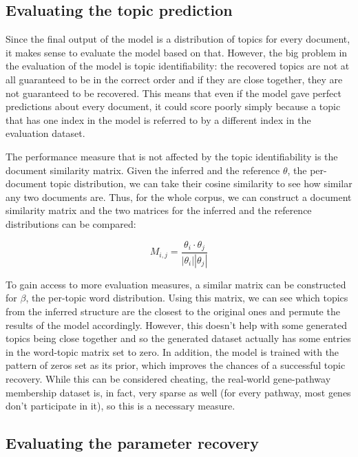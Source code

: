 \documentclass[12pt,a4paper,twoside,openright]{report}
\begin{document}
\subsection{Evaluating the topic prediction}

Since the final output of the model is a distribution of topics for every document, it makes sense to evaluate the model based on that. However, the big problem in the evaluation of the model is topic identifiability: the recovered topics are not at all guaranteed to be in the correct order and if they are close together, they are not guaranteed to be recovered. This means that even if the model gave perfect predictions about every document, it could score poorly simply because a topic that has one index in the model is referred to by a different index in the evaluation dataset.

The performance measure that is not affected by the topic identifiability is the document similarity matrix. Given the inferred and the reference $\theta$, the per-document topic distribution, we can take their cosine similarity to see how similar any two documents are. Thus, for the whole corpus, we can construct a document similarity matrix and the two matrices for the inferred and the reference distributions can be compared:

\begin{equation}
M_{i,j} = \frac{\theta_i \cdot \theta_j}{|\theta_i||\theta_j|}
\end{equation}

To gain access to more evaluation measures, a similar matrix can be constructed for $\beta$, the per-topic word distribution. Using this matrix, we can see which topics from the inferred structure are the closest to the original ones and permute the results of the model accordingly. However, this doesn't help with some generated topics being close together and so the generated dataset actually has some entries in the word-topic matrix set to zero. In addition, the model is trained with the pattern of zeros set as its prior, which improves the chances of a successful topic recovery. While this can be considered cheating, the real-world gene-pathway membership dataset is, in fact, very sparse as well (for every pathway, most genes don't participate in it), so this is a necessary measure.

\subsection{Evaluating the parameter recovery}
\end{document}
